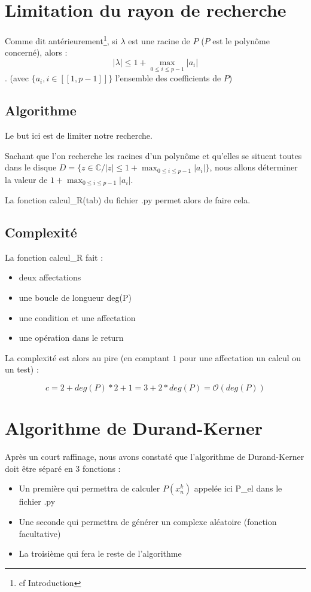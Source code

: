 \documentclass[a4paper, 11pt, hidelinks]{article}
\newcommand{\bs}{\bigskip}
\begin{document}
\section{Limitation du rayon de recherche}
Comme dit antérieurement\footnote{cf Introduction}, si $\lambda$ est une racine de $P$ ($P$ est le polynôme concerné),
alors : $$|\lambda|\leq 1+ \displaystyle\max_{0\leq i \leq p-1} |a_i|$$. (avec $\{ a_i,i \in [\![1,p-1]\!] \}$ l'ensemble des coefficients de $P$)
\bs

\subsection{Algorithme}
Le but ici est de limiter notre recherche. 
\bs

Sachant que l'on recherche les racines d'un polynôme et qu'elles se situent
toutes dans le disque $D=\{ z\in \mathbb{C}/ |z|\leq 1+ \displaystyle\max_{0\leq i \leq p-1} |a_i| \}$, nous allons déterminer 
la valeur de $1+\displaystyle\max_{0\leq i \leq p-1} |a_i|$.

La fonction calcul\_R(tab) du fichier .py permet alors de faire cela.

\subsection{Complexité}
La fonction calcul\_R fait :
\begin{itemize}
    \item deux affectations
    \item une boucle de longueur deg(P)
    \item une condition et une affectation
    \item une opération dans le return
\end{itemize}
\bs

La complexité est alors au pire (en comptant $1$ pour une affectation un calcul ou un test) :

$$c=2+deg(P)*2+1=3+2*deg(P)=\mathcal{O}(deg(P))$$


\section{Algorithme de Durand-Kerner}
Après un court raffinage, nous avons constaté que l'algorithme de Durand-Kerner doit être séparé en 3 fonctions :
\bs

\begin{itemize}
    \item Un première qui permettra de calculer $P(x_n^{k})$ appelée ici P\_el dans le fichier .py
    \item Une seconde qui permettra de générer un complexe aléatoire (fonction facultative)
    \item La troisième qui fera le reste de l'algorithme
\end{itemize}
\end{document}
